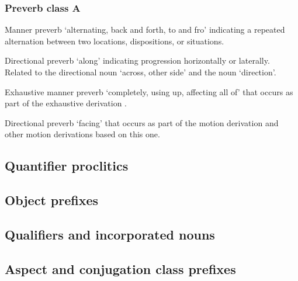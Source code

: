 \subsubsection{Preverb class A}\label{sec:inventory-preverb-A}

\begin{morphdesc}
\item[{\X[yoo=alt]{yoo=}}]
	Manner preverb ‘alternating, back and forth, to and fro’
		indicating a repeated alternation between two locations, dispositions, or situations.

\item[{\X[ÿaa=along]{ÿaa=}}]
	Directional preverb ‘along’ indicating progression horizontally or laterally.
	Related to the directional noun  ‘across, other side’
		and the noun  ‘direction’.

\item[{\X[ÿax̱=exh]{ÿax̱=}}]
	Exhaustive manner preverb ‘completely, using up, affecting all of’
		that occurs as part of the exhaustive derivation
		.

\item[{\X[ÿax̱=facing]{ÿax̱=}}]
	Directional preverb ‘facing’
		that occurs as part of the motion derivation
		and other motion derivations based on this one.
\end{morphdesc}

\subsection{Quantifier proclitics}\label{sec:inventory-qfr}

\subsection{Object prefixes}\label{sec:inventory-object}

\subsection{Qualifiers and incorporated nouns}\label{sec:inventory-qualinc}

\subsection{Aspect and conjugation class prefixes}\label{sec:inventory-aspconj}

